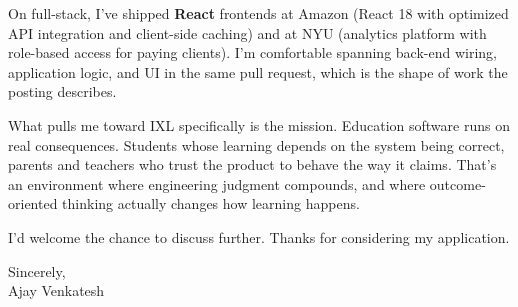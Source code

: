 \documentclass[letterpaper,11pt]{article}
\begin{document}
On full-stack, I've shipped \textbf{React} frontends at Amazon (React 18 with optimized API integration and client-side caching) and at NYU (analytics platform with role-based access for paying clients). I'm comfortable spanning back-end wiring, application logic, and UI in the same pull request, which is the shape of work the posting describes.

What pulls me toward IXL specifically is the mission. Education software runs on real consequences. Students whose learning depends on the system being correct, parents and teachers who trust the product to behave the way it claims. That's an environment where engineering judgment compounds, and where outcome-oriented thinking actually changes how learning happens.

I'd welcome the chance to discuss further. Thanks for considering my application.

\vspace{12pt}

Sincerely, \\
Ajay Venkatesh
\end{document}

